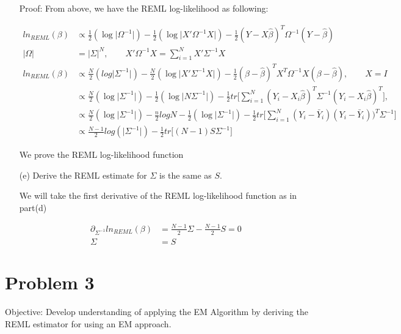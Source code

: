 \begin{itemize}
Proof: From above, we have the REML log-likelihood as following:

\begin{align*}
ln_{REML}(\beta) & \propto {\frac{1}{2}}  (\log \vert \Omega^{-1}  \vert ) -\frac{1}{2} (\log \vert X' \Omega^{-1} X \vert )  -\frac{1}{2} (Y- X \hat{\beta})^T \Omega^{-1} (Y- \hat{\beta})  \\
\vert \Omega \vert &= \vert \Sigma \vert ^{N}, \qquad X' \Omega^{-1} X = \sum_{i=1}^N X' \Sigma^{-1} X \\
ln_{REML}(\beta)  & \propto  \frac{N}{2} (log \vert \Sigma^{-1} \vert ) -\frac{N}{2}  (\log \vert X' \Sigma^{-1} X \vert ) -\frac{1}{2} (\beta- \hat{\beta})^T X^T \Omega^{-1} X (\beta- \hat{\beta}) , \qquad X= I \\
& \propto  \frac{N}{2} (\log \vert \Sigma^{-1} \vert ) -\frac{1}{2}  (\log \vert N \Sigma^{-1}  \vert ) -\frac{1}{2} tr \Big[ \sum_{i=1}^N (Y_i - X_i \hat{\beta})^T \Sigma^{-1} (Y_i - X_i \hat{\beta})^T    \Big ], \\
& \propto  \frac{N}{2} (\log \vert \Sigma^{-1} \vert )- \frac{n}{2} log N -\frac{1}{2}  (\log \vert \Sigma^{-1}  \vert ) - \frac{1}{2} tr \Big[ \sum_{i=1}^N (Y_i - \bar{Y}_i) (Y_i - \bar{Y}_i))^T \Sigma^{-1}     \Big ]   \\
& \propto \frac{N-1}{2} log(\vert \Sigma^{-1} \vert) - \frac{1}{2} tr \Big[ (N-1) S \Sigma^{-1} \Big]
\end{align*}

We prove the REML log-likelihood function

\item[(e)] Derive the REML estimate for $\Sigma$ is the same as $S$.

We will take the first derivative of the REML log-likelihood function as in part(d) 

\begin{align*}
\partial_{\Sigma^{-1}}ln_{REML}(\beta) & = \frac{N-1}{2} \Sigma- \frac{N-1}{2} S = 0 \\
\Sigma &= S
\end{align*}


\end{itemize}

\section{Problem 3}

Objective: Develop understanding of applying the EM Algorithm by deriving the REML estimator for using an EM approach. 

